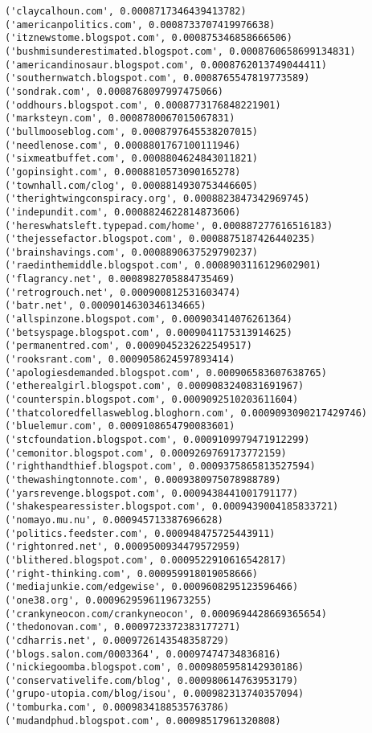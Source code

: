 \documentclass[11pt]{article}
\begin{document}
\begin{Verbatim}[commandchars=\\\{\}]
('claycalhoun.com', 0.0008717346439413782)
('americanpolitics.com', 0.0008733707419976638)
('itznewstome.blogspot.com', 0.000875346858666506)
('bushmisunderestimated.blogspot.com', 0.0008760658699134831)
('americandinosaur.blogspot.com', 0.0008762013749044411)
('southernwatch.blogspot.com', 0.0008765547819773589)
('sondrak.com', 0.0008768097997475066)
('oddhours.blogspot.com', 0.0008773176848221901)
('marksteyn.com', 0.0008780067015067831)
('bullmooseblog.com', 0.0008797645538207015)
('needlenose.com', 0.0008801767100111946)
('sixmeatbuffet.com', 0.0008804624843011821)
('gopinsight.com', 0.0008810573090165278)
('townhall.com/clog', 0.0008814930753446605)
('therightwingconspiracy.org', 0.0008823847342969745)
('indepundit.com', 0.0008824622814873606)
('hereswhatsleft.typepad.com/home', 0.000887277616516183)
('thejessefactor.blogspot.com', 0.0008875187426440235)
('brainshavings.com', 0.0008890637529790237)
('raedinthemiddle.blogspot.com', 0.0008903116129602901)
('flagrancy.net', 0.0008982705884735469)
('retrogrouch.net', 0.000900812531603474)
('batr.net', 0.0009014630346134665)
('allspinzone.blogspot.com', 0.000903414076261364)
('betsyspage.blogspot.com', 0.0009041175313914625)
('permanentred.com', 0.0009045232622549517)
('rooksrant.com', 0.0009058624597893414)
('apologiesdemanded.blogspot.com', 0.000906583607638765)
('etherealgirl.blogspot.com', 0.0009083240831691967)
('counterspin.blogspot.com', 0.0009092510203611604)
('thatcoloredfellasweblog.bloghorn.com', 0.0009093090217429746)
('bluelemur.com', 0.0009108654790083601)
('stcfoundation.blogspot.com', 0.0009109979471912299)
('cemonitor.blogspot.com', 0.0009269769173772159)
('righthandthief.blogspot.com', 0.0009375865813527594)
('thewashingtonnote.com', 0.0009380975078988789)
('yarsrevenge.blogspot.com', 0.0009438441001791177)
('shakespearessister.blogspot.com', 0.0009439004185833721)
('nomayo.mu.nu', 0.000945713387696628)
('politics.feedster.com', 0.000948475725443911)
('rightonred.net', 0.0009500934479572959)
('blithered.blogspot.com', 0.0009522910616542817)
('right-thinking.com', 0.000959918019058666)
('mediajunkie.com/edgewise', 0.0009608295123596466)
('one38.org', 0.0009629596119673255)
('crankyneocon.com/crankyneocon', 0.0009694428669365654)
('thedonovan.com', 0.0009723372383177271)
('cdharris.net', 0.0009726143548358729)
('blogs.salon.com/0003364', 0.00097474734836816)
('nickiegoomba.blogspot.com', 0.0009805958142930186)
('conservativelife.com/blog', 0.000980614763953179)
('grupo-utopia.com/blog/isou', 0.000982313740357094)
('tomburka.com', 0.0009834188535763786)
('mudandphud.blogspot.com', 0.00098517961320808)

\end{Verbatim}
\end{document}
